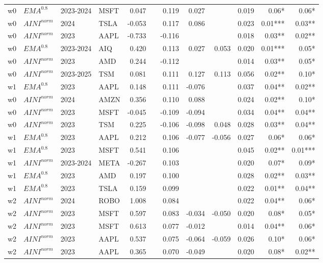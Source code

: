 {\begin{tabularx}{\textwidth}{@{}X@{\hspace{0.5pt}}X@{\hspace{0.5pt}}X@{\hspace{0.5pt}}X@{\hspace{2.0pt}} r r r r r r r r@{}}
w0 & $EMA^{0.8}$ & 2023-2024 & MSFT & 0.047 &  & 0.119 & 0.027 &  & 0.019 & 0.06* & 0.06* \\
w0 & $AINI^{norm}$ & 2024 & TSLA & -0.053 &  & 0.117 & 0.086 &  & 0.023 & 0.01*** & 0.03** \\
w0 & $AINI^{norm}$ & 2023 & AAPL & -0.733 &  & -0.116 &  &  & 0.018 & 0.03** & 0.02** \\
w0 & $EMA^{0.8}$ & 2023-2024 & AIQ & 0.420 &  & 0.113 & 0.027 & 0.053 & 0.020 & 0.01*** & 0.05* \\
w0 & $AINI^{norm}$ & 2023 & AMD & 0.244 &  & -0.112 &  &  & 0.014 & 0.03** & 0.05* \\
w0 & $AINI^{norm}$ & 2023-2025 & TSM & 0.081 &  & 0.111 & 0.127 & 0.113 & 0.056 & 0.02** & 0.10* \\
w1 & $EMA^{0.8}$ & 2023 & AAPL & 0.148 &  & 0.111 & -0.076 &  & 0.037 & 0.04** & 0.02** \\
w0 & $AINI^{norm}$ & 2024 & AMZN & 0.356 &  & 0.110 & 0.088 &  & 0.024 & 0.02** & 0.10* \\
w0 & $AINI^{norm}$ & 2023 & MSFT & -0.045 &  & -0.109 & -0.094 &  & 0.034 & 0.04** & 0.04** \\
w0 & $AINI^{norm}$ & 2023 & TSM & 0.225 &  & -0.106 & -0.098 & 0.048 & 0.028 & 0.03** & 0.04** \\
w1 & $EMA^{0.8}$ & 2023 & AAPL & 0.212 &  & 0.106 & -0.077 & -0.056 & 0.027 & 0.06* & 0.06* \\
w1 & $EMA^{0.8}$ & 2023 & MSFT & 0.541 &  & 0.106 &  &  & 0.045 & 0.02** & 0.01*** \\
w1 & $AINI^{norm}$ & 2023-2024 & META & -0.267 &  & 0.103 &  &  & 0.020 & 0.07* & 0.09* \\
w1 & $EMA^{0.8}$ & 2023 & AMD & 0.197 &  & 0.100 &  &  & 0.028 & 0.02** & 0.03** \\
w1 & $EMA^{0.8}$ & 2023 & TSLA & 0.159 &  & 0.099 &  &  & 0.022 & 0.01** & 0.04** \\
w2 & $AINI^{norm}$ & 2024 & ROBO & 1.008 &  & 0.084 &  &  & 0.022 & 0.04** & 0.06* \\
w2 & $AINI^{norm}$ & 2023 & MSFT & 0.597 &  & 0.083 & -0.034 & -0.050 & 0.020 & 0.08* & 0.05* \\
w2 & $AINI^{norm}$ & 2023 & MSFT & 0.613 &  & 0.077 & -0.012 &  & 0.014 & 0.04** & 0.06* \\
w2 & $AINI^{norm}$ & 2023 & AAPL & 0.537 &  & 0.075 & -0.064 & -0.059 & 0.026 & 0.10* & 0.06* \\
w2 & $AINI^{norm}$ & 2023 & AAPL & 0.365 &  & 0.070 & -0.049 &  & 0.020 & 0.08* & 0.02** \\

\end{tabularx}}
